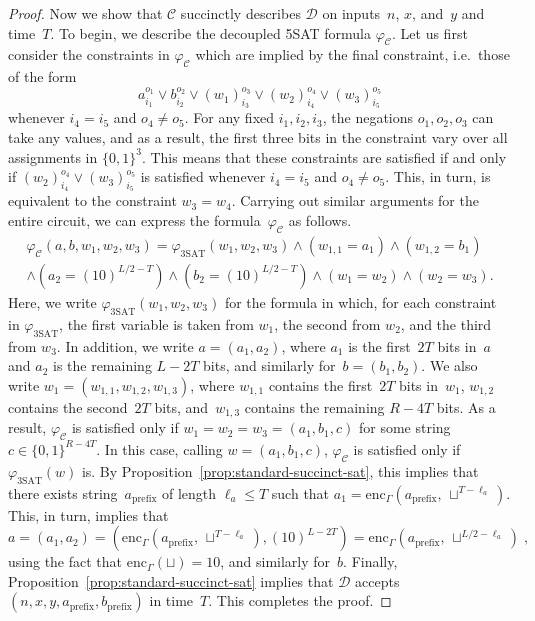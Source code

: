 \documentclass[11pt]{article}
\theoremstyle{definition}
\newcommand{\decider}{\mathcal{D}}
\newcommand{\circuit}{\mathcal{C}}
\begin{document}
\begin{proof}
  Now we show that $\circuit$ succinctly describes $\decider$ on inputs~$n$,
  $x$, and~$y$ and time~$T$.
  To begin, we describe the decoupled 5SAT formula $\varphi_{\circuit}$.
  Let us first consider the constraints in $\varphi_{\circuit}$ which are
  implied by the final constraint, i.e.\ those of the form
  \begin{equation*}
    a_{i_1}^{o_1} \lor b_{i_2}^{o_2} \lor (w_1)_{i_3}^{o_3} \lor (w_2)_{i_4}^{o_4}
    \lor (w_3)_{i_5}^{o_5}
  \end{equation*}
  whenever $i_4 = i_5$ and $o_4 \neq o_5$.
  For any fixed $i_1, i_2, i_3$, the negations $o_1, o_2, o_3$ can take any
  values, and as a result, the first three bits in the constraint vary over all
  assignments in $\{0, 1\}^3$.
  This means that these constraints are satisfied if and only if
  $(w_2)_{i_4}^{o_4} \lor (w_3)_{i_5}^{o_5}$ is satisfied whenever $i_4 = i_5$
  and $o_4 \neq o_5$.
  This, in turn, is equivalent to the constraint $w_3 = w_4$.
  Carrying out similar arguments for the entire circuit, we can express the
  formula~$\varphi_{\circuit}$ as follows.
  \begin{multline*}
    \varphi_{\circuit}(a, b, w_1, w_2, w_3)
    =
    \varphi_{\mathrm{3SAT}}(w_1, w_2, w_3)
    \land (w_{1, 1} = a_1) \land (w_{1, 2} = b_1)\\
    \land (a_2= (10)^{L/2 -T}) \land (b_2 = (10)^{L/2-T})
    \land (w_1 = w_2)
    \land (w_2 = w_3).
  \end{multline*}
  Here, we write $\varphi_{\mathrm{3SAT}}(w_1, w_2, w_3)$ for the formula in
  which, for each constraint in $\varphi_{\mathrm{3SAT}}$, the first variable is
  taken from $w_1$, the second from $w_2$, and the third from $w_3$.
  In addition, we write $a = (a_1, a_2)$, where $a_1$ is the first~$2T$ bits
  in~$a$ and $a_2$ is the remaining $L-2T$ bits, and similarly for~$b = (b_1,
  b_2)$.
  We also write $w_1 = (w_{1,1}, w_{1,2}, w_{1,3})$, where $w_{1, 1}$ contains
  the first~$2T$ bits in~$w_1$, $w_{1,2}$ contains the second~$2T$ bits,
  and~$w_{1,3}$ contains the remaining $R-4T$ bits.
  As a result, $\varphi_{\circuit}$ is satisfied only if $w_1 = w_2 = w_3 =
  (a_1, b_1, c)$ for some string $c \in \{0, 1\}^{R-4T}$.
  In this case, calling $w = (a_1, b_1, c)$, $\varphi_{\circuit}$ is satisfied
  only if $\varphi_{\mathrm{3SAT}}(w)$ is.
  By Proposition~\ref{prop:standard-succinct-sat}, this implies that there exists
  string~$a_{\mathrm{prefix}}$ of length $\ell_a \leq T$ such that $ a_1 =
  \mathrm{enc}_\Gamma(a_{\mathrm{prefix}},\,\sqcup^{T-\ell_a})$.
  This, in turn, implies that
  \begin{equation*}
    a = (a_1, a_2) = (\mathrm{enc}_\Gamma(a_{\mathrm{prefix}},\,
    \sqcup^{T-\ell_a}), (10)^{L-2T})
    = \mathrm{enc}_\Gamma(a_{\mathrm{prefix}},\,\sqcup^{L/2-\ell_a})\;,
  \end{equation*}
  using the fact that $\mathrm{enc}_\Gamma(\sqcup) = 10$, and similarly for~$b$.
  Finally, Proposition~\ref{prop:standard-succinct-sat} implies that $\decider$
  accepts $(n, x, y, a_{\mathrm{prefix}}, b_{\mathrm{prefix}})$ in time~$T$.
  This completes the proof.
\end{proof}
\end{document}
